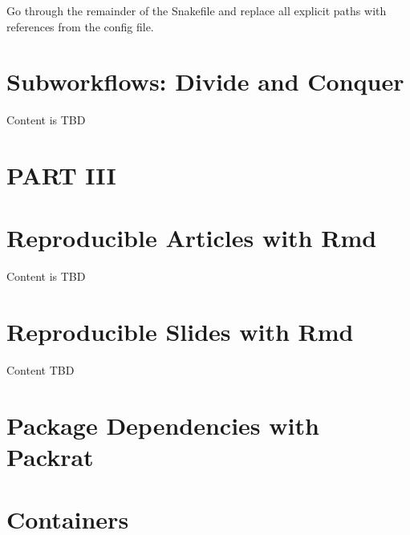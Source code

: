 \documentclass[]{book}
\theoremstyle{definition}
\theoremstyle{definition}
\theoremstyle{definition}
\theoremstyle{remark}
\begin{document}
Go through the remainder of the Snakefile and replace all explicit paths
with references from the config file.

\chapter{Subworkflows: Divide and
Conquer}\label{subworkflows-divide-and-conquer}

Content is TBD

\chapter*{PART III}\label{part-iii}

\chapter{Reproducible Articles with
Rmd}\label{reproducible-articles-with-rmd}

Content is TBD

\chapter{Reproducible Slides with
Rmd}\label{reproducible-slides-with-rmd}

Content TBD

\chapter{Package Dependencies with
Packrat}\label{package-dependencies-with-packrat}

\chapter{Containers}\label{containers}


\end{document}
